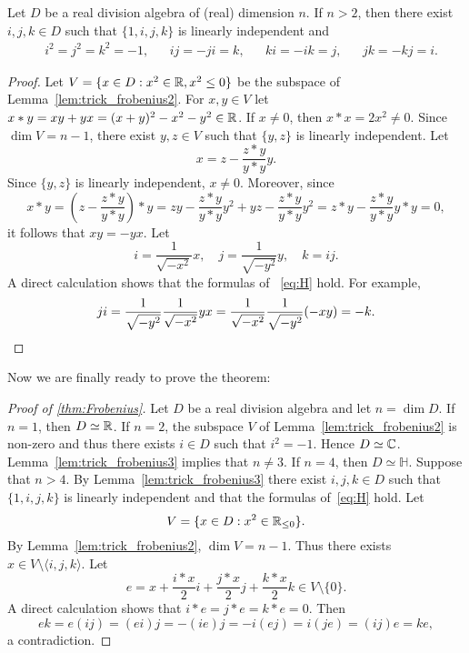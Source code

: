 \begin{lemma}
	\label{lem:trick_frobenius3}
	Let $D$ be a real division algebra of (real) dimension $n$. If $n>2$, then
	there exist $i,j,k\in D$ such that $\{1,i,j,k\}$ is linearly independent and 
	\begin{align}
	\label{eq:H}
	&i^2=j^2=k^2=-1, && ij=-ji=k, && ki=-ik=j, && jk=-kj=i.
	\end{align}
\end{lemma}

\begin{proof}
	Let $V=\{x\in D:x^2\in\mathbb{R},x^2\leq 0\}$ be the subspace of Lemma~\ref{lem:trick_frobenius2}. 
	For $x,y\in V$ let $x*
	y=xy+yx=(x+y)^2-x^2-y^2\in\mathbb{R}$. If $x\ne0$, then $x*
	x=2x^2\ne0$. Since $\dim V=n-1$, there exist $y,z\in V$ such that $\{y,z\}$ is 
	linearly independent. Let 
	\[
		x=z-\frac{z* y}{y* y}y.
	\]
	Since $\{y,z\}$ is linearly independent, $x\ne0$. Moreover, since 
	\[
		x* y
		=\left(z-\frac{z* y}{y* y}\right)* y
		=zy-\frac{z* y}{y* y}y^2+yz-\frac{z* y}{y* y}y^2
		=z* y-\frac{z* y}{y* y}y* y=0,
	\]
	it follows that $xy=-yx$. 
	Let  
	\[
		i=\frac{1}{\sqrt{-x^2}}x,
		\quad
		j=\frac{1}{\sqrt{-y^2}}y,
		\quad
		k=ij. 
	\]
	A direct calculation shows that the formulas of ~\eqref{eq:H} hold. For example, 
	\[
		ji=\frac{1}{\sqrt{-y^2}}\frac{1}{\sqrt{-x^2}}yx=\frac{1}{\sqrt{-x^2}}\frac{1}{\sqrt{-y^2}}(-xy)=-k.\qedhere
	\]
\end{proof}

Now we are finally 
ready to prove the theorem: 

\begin{proof}[Proof of \ref{thm:Frobenius}]
	Let $D$ be a real division algebra and let $n=\dim D$. If $n=1$, then 
	$D\simeq\mathbb{R}$. If $n=2$, the subspace $V$ of Lemma~\ref{lem:trick_frobenius2} 
	is non-zero and thus there exists $i\in D$ such that 
	$i^2=-1$. Hence $D\simeq\mathbb{C}$. Lemma~\ref{lem:trick_frobenius3}
	implies that $n\ne3$. If $n=4$, then $D\simeq\mathbb{H}$. Suppose that 
	$n>4$.  By Lemma~\ref{lem:trick_frobenius3} there exist
	$i,j,k\in D$ such that $\{1,i,j,k\}$ is linearly independent 
	and that the formulas of~\eqref{eq:H} hold. Let 
	\[
		V=\{x\in D:x^2\in\mathbb{R}_{\leq0}\}.
	\]
	By Lemma~\ref{lem:trick_frobenius2}, $\dim V=n-1$. Thus there exists 
	$x\in V\setminus\langle i,j,k\rangle$. Let 
	\[
		e=x+\frac{i* x}{2}i+\frac{j* x}{2}j+\frac{k* x}{2}k\in V\setminus\{0\}.
	\]
	A direct calculation shows that $i* e=j* e=k* e=0$. Then 
	\[
		ek=e(ij)=(ei)j=-(ie)j=-i(ej)=i(je)=(ij)e=ke,
	\]
	a contradiction. 
\end{proof}

